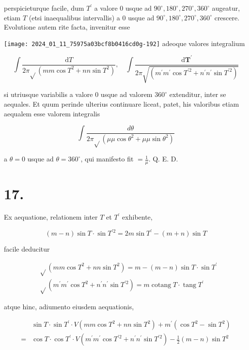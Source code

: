 \documentclass[10pt]{article}
\begin{document}
perspicieturque facile, dum \(T^{\prime}\) a valore 0 usque ad \(90^{\circ}, 180^{\circ}, 270^{\circ}, 360^{\circ}\) augeatur, etiam \(T\) (etsi inaequalibus intervallis) a 0 usque ad \(90^{\circ}, 180^{\circ}, 270^{\circ}, 360^{\circ}\) crescere. Evolutione autem rite facta, invenitur esse

\texttt{[image: 2024\_01\_11\_75975a03bcf8b0416cd0g-192]}
adeoque valores integralium

\[
\int \frac{\mathrm{d} T}{2 \pi \sqrt{ }\left(m m \cos T^{2}+n n \sin T^{2}\right)}, \quad \int \frac{\mathrm{d} \boldsymbol{T}^{\prime}}{2 \pi \sqrt{\left(m^{\prime} m^{\prime} \cos T^{\prime 2}+n^{\prime} n^{\prime} \sin T^{\prime 2}\right)}}
\]

si utriusque variabilis a valore 0 usque ad valorem \(360^{\circ}\) extenditur, inter se aequales. Et quum perinde ulterius continuare liceat, patet, his valoribus etiam aequalem esse valorem integralis

\[
\int \frac{d \theta}{2 \pi \sqrt{ }\left(\mu \mu \cos \theta^{2}+\mu \mu \sin \theta^{2}\right)}
\]

a \(\theta=0\) usque ad \(\theta=360^{\circ}\), qui manifesto fit \(=\frac{1}{\mu}\). Q. E. D.

\section*{17.}
Ex aequatione, relationem inter \(T\) et \(T^{\prime}\) exhibente,

\[
(m-n) \sin T \cdot \sin T^{\prime 2}=2 m \sin T^{\prime}-(m+n) \sin T
\]

facile deducitur

\[
\begin{aligned}
& \sqrt{ }\left(m m \cos T^{2}+n n \sin T^{2}\right)=m-(m-n) \sin T \cdot \sin T^{\prime} \\
& \sqrt{ }\left(m^{\prime} m^{\prime} \cos T^{2}+n^{\prime} n^{\prime} \sin T^{\prime 2}\right)=m \operatorname{cotang} T \cdot \operatorname{tang} T^{\prime}
\end{aligned}
\]

atque hinc, adiumento eiusdem aequationis,

\[
\begin{aligned}
& \sin T \cdot \sin T^{\prime} \cdot V\left(m m \cos T^{2}+n n \sin T^{2}\right)+m^{\prime}\left(\cos T^{2}-\sin T^{2}\right) \\
= & \cos T \cdot \cos T^{\prime} \cdot V\left(m^{\prime} m^{\prime} \cos T^{\prime 2}+n^{\prime} n^{\prime} \sin T^{\prime 2}\right)-\frac{1}{2}(m-n) \sin T^{2}
\end{aligned}
\]
\end{document}
